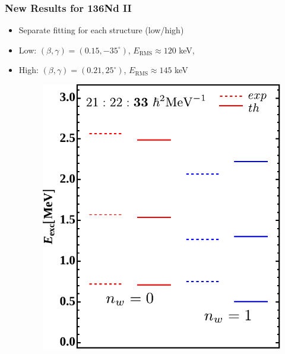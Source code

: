 \documentclass{beamer}
\begin{document}
\begin{frame}
  \frametitle{New Results for 136Nd II}
\begin{itemize}
  \item Separate fitting for each structure (low/high)
  \item Low: $(\beta,\gamma)=(0.15,-35^\circ)$, $E_\text{RMS}\approx 120$ keV,
  \item High: $(\beta,\gamma)=(0.21,25^\circ)$, $E_\text{RMS}\approx 145$ keV
  \begin{figure}
    \centering
    \includegraphics[scale=0.458]{Figs/136Nd-excitation-lower-edited.pdf}

\end{figure}
\end{itemize}
\end{frame}
\end{document}
